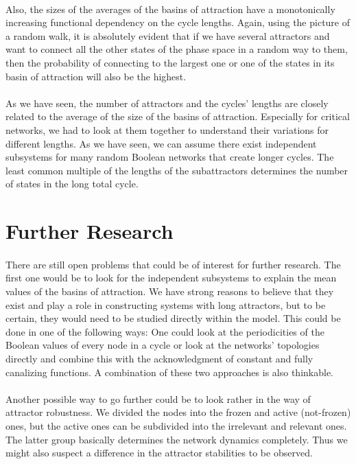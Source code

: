 \paragraph*{}
Also, the sizes of the averages of the basins of attraction have a monotonically increasing functional dependency on the cycle lengths. Again, using the picture of a random walk, it is absolutely evident that if we have several attractors and want to connect all the other states of the phase space in a random way to them, then the probability of connecting to the largest one or one of the states in its basin of attraction will also be the highest.

\paragraph*{}
As we have seen, the number of attractors and the cycles' lengths are closely related to the average of the size of the basins of attraction. Especially for critical networks, we had to look at them together to understand their variations for different lengths. As we have seen, we can assume there exist independent subsystems for many random Boolean networks that create longer cycles. The least common multiple of the lengths of the subattractors determines the number of states in the long total cycle.

\section{Further Research}
\paragraph*{}
There are still open problems that could be of interest for further research. The first one would be to look for the independent subsystems to explain the mean values of the basins of attraction. We have strong reasons to believe that they exist and play a role in constructing systems with long attractors, but to be certain, they would need to be studied directly within the model. This could be done in one of the following ways: One could look at the periodicities of the Boolean values of every node in a cycle or look at the networks' topologies directly and combine this with the acknowledgment of constant and fully canalizing functions. A combination of these two approaches is also thinkable.

\paragraph*{}
Another possible way to go further could be to look rather in the way of attractor robustness. We divided the nodes into the frozen and active (not-frozen) ones, but the active ones can be subdivided into the irrelevant and relevant ones. The latter group basically determines the network dynamics completely. Thus we might also suspect a difference in the attractor stabilities to be observed.

